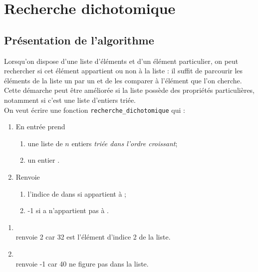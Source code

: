    \chapter{Recherche dichotomique}

\section{Présentation de l'algorithme}

Lorsqu'on dispose d'une liste d'éléments et d'un élément particulier, on peut rechercher si cet élément appartient ou non à la liste : il suffit de parcourir les éléments de la liste un par un et de les comparer à l'élément que l'on cherche. Cette démarche peut être améliorée si la liste possède des propriétés particulières, notamment si c'est une liste d'entiers triée.\\

On veut écrire une fonction \texttt{recherche\_dichotomique} qui :
\begin{enumerate}[--]
    \item   En entrée prend \begin{enumerate}[--]
                                \item   une liste  de $n$ entiers \textit{triée dans l'ordre croissant};
                                \item   un entier .
                            \end{enumerate}
    \item  Renvoie \begin{enumerate}[--]
                        \item   l'indice de  dans  si  appartient à ;
                        \item   -1 si a n'appartient pas à .
                    \end{enumerate} 
\end{enumerate}

\begin{exemple}[]
\begin{enumerate}[--]
    \item   {} \\renvoie 2 car 32 est l'élément d'indice 2 de la liste.
    \item   {} \\renvoie -1 car 40 ne figure pas dans la liste.
\end{enumerate}
\end{exemple}

